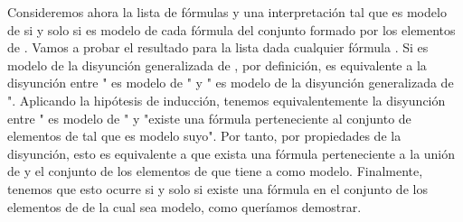 \begin{isabellebody}
\begin{isamarkuptext}
\begin{demostracion}
    Consideremos ahora la lista de fórmulas  y una interpretación
    \isa{{\isasymA}} tal que es modelo de  si y solo si es modelo de cada
    fórmula del conjunto formado por los elementos de . Vamos a
    probar el resultado para la lista  dada cualquier fórmula
    . Si \isa{{\isasymA}} es modelo de la disyunción generalizada de , por
    definición, es equivalente a la disyunción entre "\isa{{\isasymA}} es modelo de
    " y "\isa{{\isasymA}} es modelo de la disyunción generalizada de ". 
    Aplicando la hipótesis de inducción, tenemos equivalentemente la
    disyunción entre "\isa{{\isasymA}} es modelo de " y "existe una fórmula
    perteneciente al conjunto de elementos de  tal que \isa{{\isasymA}} es
    modelo suyo". Por tanto, por propiedades de la disyunción, esto es 
    equivalente a que exista una fórmula perteneciente a la unión de
     y el conjunto de los elementos de  que tiene a \isa{{\isasymA}} como 
    modelo. Finalmente, tenemos que esto ocurre si y solo si
    existe una fórmula en el conjunto de los elementos de  de la 
    cual \isa{{\isasymA}} sea modelo, como queríamos demostrar.
  \end{demostracion}


\end{isamarkuptext}
\end{isabellebody}
